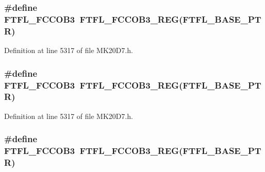 \subsubsection[{\texorpdfstring{F\+T\+F\+L\+\_\+\+F\+C\+C\+O\+B3}{FTFL_FCCOB3}}]{\setlength{\rightskip}{0pt plus 5cm}\#define F\+T\+F\+L\+\_\+\+F\+C\+C\+O\+B3~{\bf F\+T\+F\+L\+\_\+\+F\+C\+C\+O\+B3\+\_\+\+R\+EG}({\bf F\+T\+F\+L\+\_\+\+B\+A\+S\+E\+\_\+\+P\+TR})}\hypertarget{group___f_t_f_l___register___accessor___macros_ga4b4377f063f2824924b069a33637fa2f}{}\label{group___f_t_f_l___register___accessor___macros_ga4b4377f063f2824924b069a33637fa2f}


Definition at line 5317 of file M\+K20\+D7.\+h.

\subsubsection[{\texorpdfstring{F\+T\+F\+L\+\_\+\+F\+C\+C\+O\+B3}{FTFL_FCCOB3}}]{\setlength{\rightskip}{0pt plus 5cm}\#define F\+T\+F\+L\+\_\+\+F\+C\+C\+O\+B3~{\bf F\+T\+F\+L\+\_\+\+F\+C\+C\+O\+B3\+\_\+\+R\+EG}({\bf F\+T\+F\+L\+\_\+\+B\+A\+S\+E\+\_\+\+P\+TR})}\hypertarget{group___f_t_f_l___register___accessor___macros_ga4b4377f063f2824924b069a33637fa2f}{}\label{group___f_t_f_l___register___accessor___macros_ga4b4377f063f2824924b069a33637fa2f}


Definition at line 5317 of file M\+K20\+D7.\+h.

\subsubsection[{\texorpdfstring{F\+T\+F\+L\+\_\+\+F\+C\+C\+O\+B3}{FTFL_FCCOB3}}]{\setlength{\rightskip}{0pt plus 5cm}\#define F\+T\+F\+L\+\_\+\+F\+C\+C\+O\+B3~{\bf F\+T\+F\+L\+\_\+\+F\+C\+C\+O\+B3\+\_\+\+R\+EG}({\bf F\+T\+F\+L\+\_\+\+B\+A\+S\+E\+\_\+\+P\+TR})}\hypertarget{group___f_t_f_l___register___accessor___macros_ga4b4377f063f2824924b069a33637fa2f}{}\label{group___f_t_f_l___register___accessor___macros_ga4b4377f063f2824924b069a33637fa2f}


